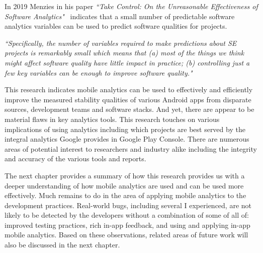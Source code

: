 In 2019 Menzies in his paper \emph{``Take Control: On the Unreasonable Effectiveness of Software Analytics"}~\cite{menzies2019take} indicates that a small number of predictable software analytics variables can be used to predict software qualities for projects. 

\emph{``Specifically, the number of variables required to make predictions about SE projects is remarkably small which means that (a) most of the things we think might affect software quality have little impact in practice; (b) controlling just a few key variables can be enough to improve software quality."}

This research indicates mobile analytics can be used to effectively and efficiently improve the measured stability qualities of various Android apps from disparate sources, development teams and software stacks. And yet, there are appear to be material flaws in key analytics tools. This research touches on various implications of using analytics including which projects are best served by the integral analytics Google provides in Google Play Console. There are numerous areas of potential interest to researchers and industry alike including the integrity and accuracy of the various tools and reports.

The next chapter provides a summary of how this research provides us with a deeper understanding of how mobile analytics are used and can be used more effectively. Much remains to do in the area of applying mobile analytics to the development practices. Real-world bugs, including several I experienced, are not likely to be detected by the developers without a combination of some of all of: improved testing practices, rich in-app feedback, and using and applying in-app mobile analytics. Based on these observations, related areas of future work will also be discussed in the next chapter. 
